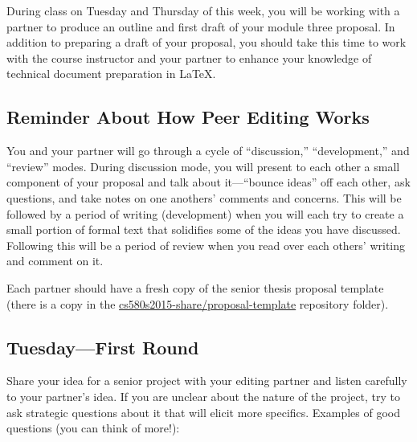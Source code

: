 

\usepackage[compact]{titlesec}




During class on Tuesday and Thursday of this week, you will be working with a partner to produce an outline and first
draft of your module three proposal. In addition to preparing a draft of your proposal, you should take this time to
work with the course instructor and your partner to enhance your knowledge of technical document preparation in \LaTeX.

\subsection*{Reminder About How Peer Editing Works}

You and your partner will go through a cycle of ``discussion,'' ``development,'' and ``review''  modes.  During
discussion mode, you will present to each other a small component of your proposal and talk about it---``bounce ideas''
off each other, ask questions, and take notes on one anothers' comments and concerns.  This will be followed by a period
of writing (development) when you will each try to create a small portion of formal text that solidifies some of the
ideas you have discussed.  Following this will be a period of review when you read over each others' writing and comment
on it.

Each partner should have a fresh copy of the senior thesis proposal template
(there is a copy in the \url{cs580s2015-share/proposal-template} repository
folder).

\subsection*{Tuesday---First Round}

 Share your idea for a senior project with your editing
partner and listen carefully to your partner's idea. If you are unclear about
the nature of the project, try to ask strategic questions about it that will
elicit more specifics. Examples of good questions (you can think of more!):

